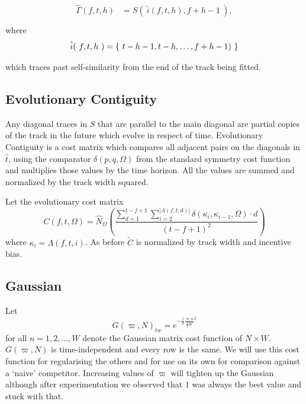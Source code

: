 \documentclass[twocolumn]{article}
\begin{document}
\begin{align*}
\begin{array}{ll}
\hat{\Gamma}( f,t,h ) &= S(~\hat{i}(f, t, h), f + h - 1~),\\
\end{array}
\end{align*}
where
\begin{dmath*}
	\hat{i}(~f, t, h~) =\\ \{~ t - h - 1, t - h, \ldots, f+h-1 ) ~\}
\end{dmath*}

	which traces past self-similarity from the end of the track being fitted.
	
	\subsection{Evolutionary Contiguity}
	
	Any diagonal traces in $S$ that are parallel to the main diagonal are partial copies of the track in the future which evolve in respect of time. Evolutionary Contiguity is a cost matrix which compares all adjacent pairs on the diagonals in $\hat t$, using the comparator $\delta( p,q, \Omega )$ from the standard symmetry cost function and multiplies those values by the time horizon. All the values are summed and normalized by the track width squared. 
	
	Let the evolutionary cost matrix
	\begin{dmath*} C(f, t, \Omega) =  
		\hat N_\Omega\left(\frac{
		\sum_{d=1}^{t-f+1} 
		\sum_{i=2}^{|\Lambda( f,t,d )|}  \delta( \kappa_{i}, \kappa_{i-1}, \Omega ) \cdot d
	}{(t-f+1)^2}\right)
	\end{dmath*}  where  $\kappa_i=\Lambda( f,t,i )$. As before $\tilde C$ is normalized by track width and incentive bias.
	
	\subsection{Gaussian}
	Let \[
	G( \varpi, N )_{tw} = e^{ - \frac{1}{2} \frac{\varpi n}{ \frac{1}{2} W}^2  }
	\] for all $n=1,2,\ldots,W$ denote the Gaussian matrix cost function of $N\times W$. $G( \varpi, N )$ is time-independent and every row is the same. We will use this cost function for regularising the others and for use on its own for comparison against a `naive' competitor. Increasing values of $\varpi$ will tighten up the Gaussian although after experimentation we observed that $1$ was always the best value and stuck with that.
	
\end{document}
